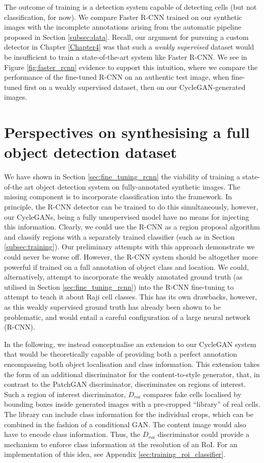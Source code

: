 The outcome of training is a detection system capable of detecting cells (but not classification, for now). We compare Faster R-CNN trained on our synthetic images with the incomplete annotations arising from the automatic pipeline proposed in Section \ref{subsec:data}. Recall, our argument for pursuing a custom detector in Chapter \ref{Chapter4} was that such a \emph{weakly supervised} dataset would be insufficient to train a state-of-the-art system like Faster R-CNN. We see in Figure \ref{fig:faster_rcnn} evidence to support this intuition, where we compare the performance of the fine-tuned R-CNN on an authentic test image, when fine-tuned first on a weakly supervised dataset, then on our CycleGAN-generated images.

\section{Perspectives on synthesising a full object detection dataset}

We have shown in Section \ref{sec:fine_tuning_rcnn} the viability of training a state-of-the art object detection system on fully-annotated synthetic images. The missing component is to incorporate classification into the framework. In principle, the R-CNN detector can be trained to do this simultaneously, however, our CycleGANs, being a fully unsupervised model have no means for injecting this information. Clearly, we could use the R-CNN as a region proposal algorithm and classify regions with a separately trained classifier (such as in Section \ref{subsec:training}). Our preliminary attempts with this approach demonstrate we could never be worse off. However, the R-CNN system should be altogether more powerful if trained on a full annotation of object class and location. We could, alternatively, attempt to incorporate the weakly annotated ground truth (as utilised in Section \ref{sec:fine_tuning_rcnn}) into the R-CNN fine-tuning to attempt to teach it about Raji cell classes. This has its own drawbacks, however, as this weakly supervised ground truth has already been shown to be problematic, and would entail a careful configuration of a large neural network (R-CNN).

In the following, we instead conceptualise an extension to our CycleGAN system that would be theoretically capable of providing both a perfect annotation encompassing both object localisation and class information. This extension takes the form of an additional discriminator for the content-to-style generator, that, in contrast to the PatchGAN discriminator, discriminates on regions of interest. Such a region of interest discriminator, $D_{roi}$ compares fake cells localised by bounding boxes inside generated images with a pre-cropped ``library'' of real cells. The library can include class information for the individual crops, which can be combined in the fashion of a conditional GAN. The content image would also have to encode class information. Thus, the $D_{roi}$ discriminator could provide a mechanism to enforce class information at the resolution of an RoI. For an implementation of this idea, see Appendix \ref{sec:training_roi_classifier}.

